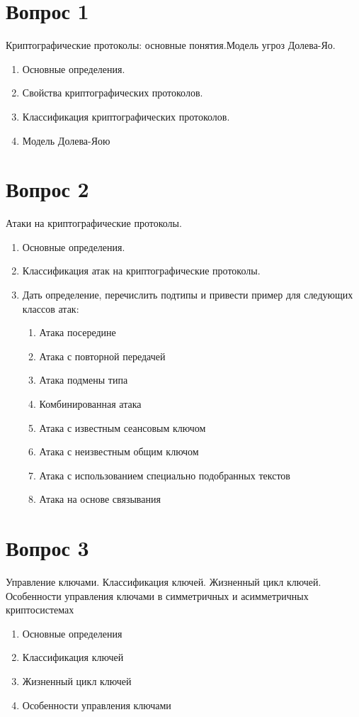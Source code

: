 \documentclass[a4paper,12pt]{article}
\author{Деркач Максим Юрьевич}
\begin{document}
	
	\section{Вопрос 1}
	Криптографические протоколы: основные понятия.Модель угроз Долева-Яо.
	\begin{enumerate}
		\item Основные определения.
		\item Свойства криптографических протоколов.
		\item Классификация криптографических  протоколов.
		\item Модель Долева-Яою
	\end{enumerate}
	\newpage
	
	\section{Вопрос 2}
	Атаки на криптографические протоколы.
	\begin{enumerate}
		\item Основные определения.
		\item Классификация атак на криптографические  протоколы.
		\item Дать определение, перечислить подтипы и привести пример для следующих классов атак:
		\begin{enumerate}
			\item Атака посередине
			\item Атака с повторной передачей
			\item Атака подмены типа
			\item Комбинированная атака
			\item Атака с известным сеансовым ключом
			\item Атака с неизвестным общим ключом
			\item Атака с использованием специально подобранных текстов
			\item Атака на основе связывания
			
		\end{enumerate}    
	\end{enumerate}
	\newpage
	
	\section{Вопрос 3}
	Управление ключами. Классификация ключей. Жизненный цикл ключей. Особенности управления ключами в симметричных и асимметричных криптосистемах
	\begin{enumerate}
		\item Основные определения
		\item Классификация ключей
		\item Жизненный цикл ключей
		\item Особенности управления ключами
	\end{enumerate}
	\newpage
	
\end{document}
